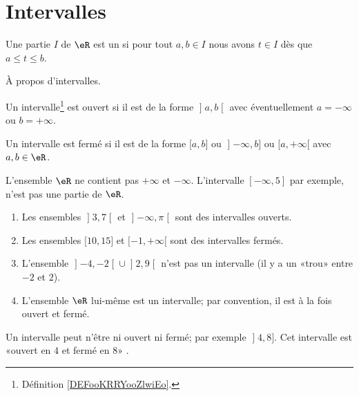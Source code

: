 
\section{Intervalles}

\begin{definition}[Intervalle]      \label{DEFooKRRYooZlwiEo}
	Une partie \( I\) de \( \eR\) est un  si pour tout \( a,b\in I\) nous avons \( t\in I\) dès que \( a\leq t\leq b\).
\end{definition}

\begin{proposition}     \label{PROPooJJRZooACUmWN}
	À propos d'intervalles.
	\begin{description}
		\item
		      Un intervalle\footnote{Définition \ref{DEFooKRRYooZlwiEo}.} est ouvert si il est de la forme \( \mathopen] a , b \mathclose[\) avec éventuellement \( a=-\infty\) ou \( b=+\infty\).
		\item
		      Un intervalle est fermé si il est de la forme \( \mathopen[ a , b \mathclose]\) ou \( \mathopen] -\infty , b \mathclose]\) ou \( \mathopen[ a , +\infty [\) avec \( a,b\in \eR\).
	\end{description}
\end{proposition}

\begin{remark}
	L'ensemble \( \eR\) ne contient pas \( +\infty\) et \( -\infty\). L'intervalle \( [-\infty, 5]\) par exemple, n'est pas une partie de \( \eR\).
\end{remark}

\begin{example}
	\begin{enumerate}
		\item
		      Les ensembles \( \mathopen] 3 , 7 \mathclose[\) et \( \mathopen] -\infty , \pi \mathclose[\) sont des intervalles ouverts.
		\item
		      Les ensembles \( \mathopen[ 10 , 15 \mathclose]\) et \( \mathopen[ -1 , +\infty [\) sont des intervalles fermés.
		\item
		      L'ensemble \( \mathopen] -4 , -2 \mathclose[\cup\mathopen] 2 , 9 \mathclose[\) n'est pas un intervalle (il y a un «trou» entre \(- 2\) et \( 2\)).
		\item
		      L'ensemble \( \eR\) lui-même est un intervalle; par convention, il est à la fois ouvert et fermé.
	\end{enumerate}
	Un intervalle peut n'être ni ouvert ni fermé; par exemple \( \mathopen] 4 , 8 \mathclose]\). Cet intervalle est «ouvert en \( 4\) et fermé en \( 8\)» .
\end{example}

